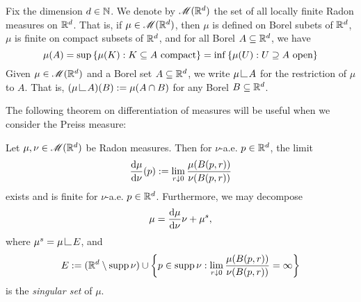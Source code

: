Fix the dimension $d \in \mathbb{N}$. We denote by $\mathscr{M}(\mathbb{R}^d)$ the set of all locally finite Radon measures on $\mathbb{R}^d$. That is, if $\mu \in \mathscr{M}(\mathbb{R}^d)$, then $\mu$ is defined on Borel subets of $\mathbb{R}^d$, $\mu$ is finite on compact subsets of $\mathbb{R}^d$, and for all Borel $A \subseteq \mathbb{R}^d$, we have
\begin{equation}
    \mu(A) = \sup\left\{ {\mu(K) : K \subseteq A \text{ compact}} \right\} = \inf\left\{ {\mu(U) : U \supseteq A \text{ open}} \right\}
\end{equation}
Given $\mu \in \mathscr{M}(\mathbb{R}^d)$ and a Borel set $A \subseteq \mathbb{R}^d$, we write $\mu \restrict A$ for the restriction of $\mu$ to $A$. That is, $(\mu \restrict A)(B) := \mu(A \cap B)$ for any Borel $B \subseteq \mathbb{R}^d$.

The following theorem on differentiation of measures will be useful when we consider the Preiss measure:
\begin{theorem}[Besicovitch] \label{thm:besicovitch}
    Let $\mu,\nu \in \mathscr{M}(\mathbb{R}^d)$ be Radon measures. Then for $\nu$-a.e. $p \in \mathbb{R}^d$, the limit
    \begin{equation}
        \frac{\operatorname{d}\!{\mu}}{\operatorname{d}\!{\nu}}(p) := \lim_{r \downarrow 0} \frac{\mu(B(p,r))}{\nu(B(p,r))}
    \end{equation}
    exists and is finite for $\nu$-a.e. $p \in \mathbb{R}^d$. Furthermore, we may decompose
    \begin{equation}
        \mu = \frac{\operatorname{d}\!{\mu}}{\operatorname{d}\!{\nu}} \nu + \mu^s,
    \end{equation}
    where $\mu^s = \mu \restrict E$, and 
    \begin{equation}
        E := (\mathbb{R}^d \setminus \operatorname{supp}{\nu}) \cup \left\{ { p \in \operatorname{supp}{\nu} : \lim_{r \downarrow 0} \frac{\mu(B(p,r))}{\nu(B(p,r))} = \infty } \right\}
    \end{equation}
    is the \textit{singular set} of $\mu$.
\end{theorem}

